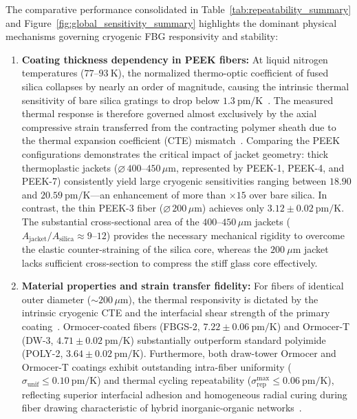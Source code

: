 \documentclass[preprint,11pt]{elsarticle}
\begin{document}
The comparative performance consolidated in Table~\ref{tab:repeatability_summary} and Figure~\ref{fig:global_sensitivity_summary} highlights the dominant physical mechanisms governing cryogenic FBG responsivity and stability:

\begin{enumerate}
    \item \textbf{Coating thickness dependency in PEEK fibers:} At liquid nitrogen temperatures ($77$--$93~\text{K}$), the normalized thermo-optic coefficient of fused silica collapses by nearly an order of magnitude, causing the intrinsic thermal sensitivity of bare silica gratings to drop below $1.3~\text{pm/K}$~\cite{Lupi2008,Salin2008,Rajan2013}. The measured thermal response is therefore governed almost exclusively by the axial compressive strain transferred from the contracting polymer sheath due to the thermal expansion coefficient (CTE) mismatch~\cite{Rajan2013,NIST_CryoMaterials}. Comparing the PEEK configurations demonstrates the critical impact of jacket geometry: thick thermoplastic jackets ($\varnothing\,400$--$450\,\mu\text{m}$, represented by PEEK-1, PEEK-4, and PEEK-7) consistently yield large cryogenic sensitivities ranging between $18.90$ and $20.59~\text{pm/K}$—an enhancement of more than $\times 15$ over bare silica. In contrast, the thin PEEK-3 fiber ($\varnothing\,200\,\mu\text{m}$) achieves only $3.12 \pm 0.02~\text{pm/K}$. The substantial cross-sectional area of the $400$--$450\,\mu\text{m}$ jackets ($A_{\text{jacket}}/A_{\text{silica}} \approx 9$--$12$) provides the necessary mechanical rigidity to overcome the elastic counter-straining of the silica core, whereas the $200~\mu\text{m}$ jacket lacks sufficient cross-section to compress the stiff glass core effectively.

    \item \textbf{Material properties and strain transfer fidelity:} For fibers of identical outer diameter ($\sim 200\,\mu\text{m}$), the thermal responsivity is dictated by the intrinsic cryogenic CTE and the interfacial shear strength of the primary coating~\cite{Zhao2007,NIST_CryoMaterials}. Ormocer-coated fibers (FBGS-2, $7.22 \pm 0.06~\text{pm/K}$) and Ormocer-T (DW-3, $4.71 \pm 0.02~\text{pm/K}$) substantially outperform standard polyimide (POLY-2, $3.64 \pm 0.02~\text{pm/K}$). Furthermore, both draw-tower Ormocer and Ormocer-T coatings exhibit outstanding intra-fiber uniformity ($\sigma_{\text{unif}} \le 0.10~\text{pm/K}$) and thermal cycling repeatability ($\sigma_{\text{rep}}^{\max} \le 0.06~\text{pm/K}$), reflecting superior interfacial adhesion and homogeneous radial curing during fiber drawing characteristic of hybrid inorganic-organic networks~\cite{Popall1998}.


\end{enumerate}
\end{document}
